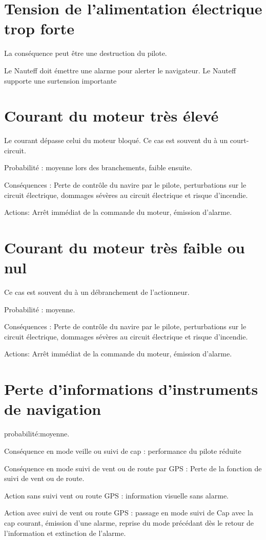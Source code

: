 \documentclass[a4paper,11pt]{report}
\begin{document}
\section {Tension de l'alimentation électrique trop forte}
La conséquence peut être une destruction du pilote.

Le Nauteff doit émettre une alarme pour alerter le navigateur.
Le Nauteff supporte une surtension importante

\section {Courant du moteur très élevé}
Le courant dépasse celui du moteur bloqué.
Ce cas est souvent du à un court-circuit.

Probabilité : moyenne lors des branchements, faible ensuite.

Conséquences : Perte de contrôle du navire par le pilote, perturbations sur le circuit électrique, dommages sévères au circuit électrique et risque d'incendie.

Actions: Arrêt immédiat de la commande du moteur, émission d'alarme.

\section {Courant du moteur très faible ou nul}
Ce cas est souvent du à un débranchement de l'actionneur.

Probabilité : moyenne.

Conséquences : Perte de contrôle du navire par le pilote, perturbations sur le circuit électrique, dommages sévères au circuit électrique et risque d'incendie.

Actions: Arrêt immédiat de la commande du moteur, émission d'alarme.

\section {Perte d'informations d'instruments de navigation}

probabilité:moyenne.

Conséquence en mode veille ou suivi de cap : performance du pilote réduite

Conséquence en mode suivi de vent ou de route par GPS : Perte de la fonction de suivi de vent ou de route.

Action sans suivi  vent ou route GPS : information visuelle sans alarme.

Action avec suivi de vent ou route GPS : passage en mode suivi de Cap avec la cap courant,
émission d'une alarme, reprise du mode précédant dès le retour de l'information et extinction de l'alarme.
\end{document}
